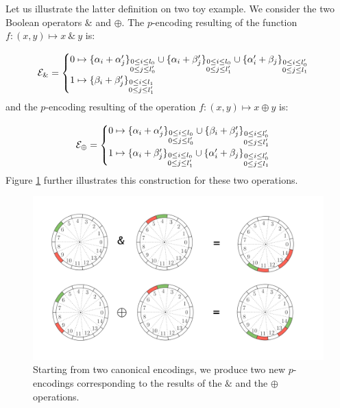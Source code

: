 Let us illustrate the latter definition on two toy example. We consider the two Boolean operators $\&$ and $\oplus$. The $p$-encoding resulting of the function $f: (x, y) \mapsto x ~\&~ y$ is: 

\begin{equation}
\mathcal{E}_\& = \begin{cases}
0 \mapsto \{\alpha_i + \alpha'_j\}_{\substack{0\le i \le l_0 \\ 0 \le j \le l_0'}} \cup \{\alpha_i + \beta'_j\}_{\substack{0 \le i \le l_0 \\ 0 \le j \le l'_1}} \cup \{\alpha'_i + \beta_j\}_{\substack{0 \le i \le l'_0 \\ 0 \le j \le l_1}}\\
1 \mapsto \{\beta_i + \beta'_j\}_{\substack{0\le i \le l_1 \\ 0 \le j \le l_1'}}
\end{cases}
\label{eq:encoding_and}
\end{equation}
and the $p$-encoding resulting of the operation $f: (x, y) \mapsto x \oplus y$ is:

\begin{equation}
\mathcal{E}_\oplus = \begin{cases}
0 \mapsto \{\alpha_i + \alpha'_j\}_{\substack{0\le i \le l_0 \\ 0 \le j \le l_0'}} \cup \{\beta_i + \beta'_j\}_{\substack{0 \le i \le l'_0 \\ 0 \le j \le l'_1}}\\
1 \mapsto \{\alpha_i + \beta'_j\}_{\substack{0\le i \le l_0 \\ 0 \le j \le l_1'}} \cup \{\alpha'_i + \beta_j\}_{\substack{0\le i \le l_0' \\ 0 \le j \le l_1}} \\
\end{cases}
\label{eq:encoding_xor}
\end{equation}
%
Figure \ref{fig:operations} further illustrates this construction for these two operations.

\begin{figure}
    \centering
    \includegraphics[width=\textwidth]{img/to_harmonize/operators.png}
    \caption{Starting from two canonical encodings, we produce two new $p$-encodings corresponding to the results of the $\&$ and the $\oplus$ operations.}
    \label{fig:operations}
\end{figure}


